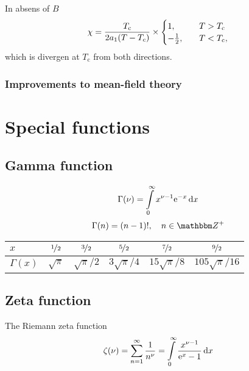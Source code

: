 \documentclass[11pt,letter, swedish, english, twocolumn
]{article}
\newcommand{\Tc}{\ensuremath{{T_{\text{c}}}}}
\begin{document}
In absens of $B$
\begin{equation}
\chi=\frac{\Tc}{2a_1(T-T_c)}\times
\begin{cases}
1, &T>\Tc\\
-\frac{1}{2}\qcomma &T<\Tc,
\end{cases}
\end{equation}
which is divergen at $\Tc$ from both directions. 


\subsubsection{Improvements to mean-field theory}














\clearpage
\appendix
\section{Special functions}
\subsection{Gamma function}
\begin{equation}
\Gamma(\nu)=\int_0^\infty x^{\nu-1}\ee^{-x}\id{x}
\end{equation}
\begin{equation}
\Gamma(n)=(n-1)!\qcomma n\in\Z^+
\end{equation}

\begin{center}
\begin{tabular}{|l||c|c|c|c|c|}\hline
$x$ & $\nicefrac{1}{2}$ & $\nicefrac{3}{2}$ & $\nicefrac{5}{2}$
& $\nicefrac{7}{2}$ & $\nicefrac{9}{2}$\\ \hline
$\Gamma(x)$ & $\sqrt{\pi}$ & $\sqrt{\pi}/2$ & $3\sqrt{\pi}/4$
& $15\sqrt{\pi}/8$ & $105\sqrt{\pi}/16$
\\ \hline
\end{tabular}
\end{center}


\subsection{Zeta function}
The Riemann zeta function
\begin{equation}
\zeta(\nu)=\sum_{n=1}^\infty \frac{1}{n^\nu}
=\int_0^\infty \frac{x^{\nu-1}}{\ee^x -1}\id{x}
\end{equation}
\end{document}
